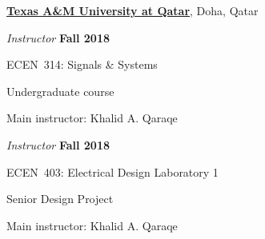 \documentclass[10pt]{article}
\newcommand{\halfblankline}{\quad\vspace{-0.5\baselineskip}\pagebreak[3]}
\begin{document}
\href{http://www.qatar.tamu.edu/}{\textbf{Texas A\&M University at Qatar}},
Doha, Qatar
\begin{outerlist}
\item[] \textit{Instructor} \hfill \textbf{Fall 2018}
    \begin{innerlist}
        \item ECEN~314: Signals \& Systems
        \begin{innerlist}
            \item[] Undergraduate course
            \item[] Main instructor: Khalid A. Qaraqe
        \end{innerlist}
    \end{innerlist}

\item[] \textit{Instructor} \hfill \textbf{Fall 2018}
    \begin{innerlist}
        \item ECEN~403: Electrical Design Laboratory 1
        \begin{innerlist}
            \item[] Senior Design Project
            \item[] Main instructor: Khalid A. Qaraqe
        \end{innerlist}
    \end{innerlist}
\end{outerlist}

\halfblankline
\end{document}
